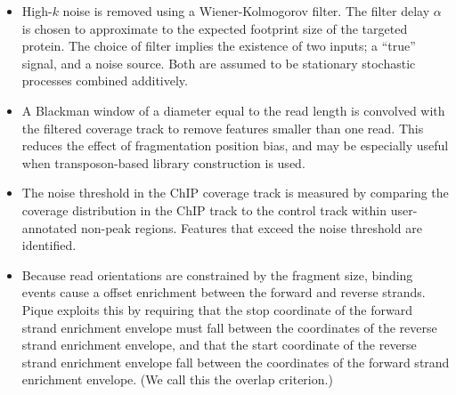 \documentclass{bioinfo}
\begin{document}
\begin{methods}
\begin{itemize}
%

\item High-$k$ noise is removed using a Wiener-Kolmogorov filter. The
  filter delay $\alpha$ is chosen to approximate to the expected
  footprint size of the targeted protein. The choice of filter implies
  the existence of two inputs; a ``true'' signal, and a noise
  source. Both are assumed to be stationary stochastic processes
  combined additively.


\item A Blackman window of a diameter equal to the read length is
  convolved with the filtered coverage track to remove features
  smaller than one read. This reduces the effect of fragmentation
  position bias, and may be especially useful when transposon-based
  library construction is used.

\item The noise threshold in the ChIP coverage track is measured by
  comparing the coverage distribution in the ChIP track to the control
  track within user-annotated non-peak regions. Features that exceed
  the noise threshold are identified.

\item Because read orientations are constrained by the fragment size,
  binding events cause a offset enrichment between the forward and
  reverse strands. Pique exploits this by requiring that the stop
  coordinate of the forward strand enrichment envelope must fall
  between the coordinates of the reverse strand enrichment envelope,
  and that the start coordinate of the reverse strand enrichment
  envelope fall between the coordinates of the forward strand
  enrichment envelope. (We call this the overlap criterion.)

\end{itemize}


\end{methods}
\end{document}
